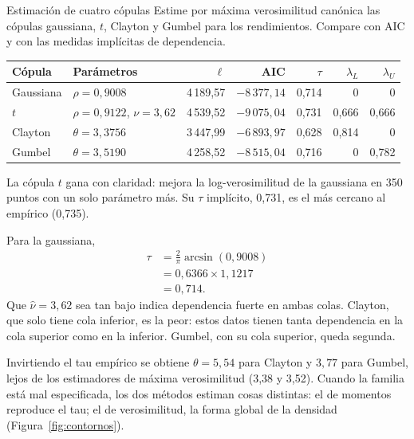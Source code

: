 \begin{ejresuelto}{Estimación de cuatro cópulas}\label{ej:cuatro}
\enunciado Estime por máxima verosimilitud canónica las cópulas gaussiana, $t$, Clayton y Gumbel para los rendimientos.
Compare con AIC y con las medidas implícitas de dependencia.

\solucion
{}
\begin{center}\small
\begin{tabular}{@{}llrrrrr@{}}
\toprule
Cópula & Parámetros & $\ell$ & AIC & $\tau$ & $\lambda_L$ & $\lambda_U$ \\
\midrule
Gaussiana & $\rho=0{,}9008$ & 4\,189,57 & $-8\,377{,}14$ & 0,714 & 0 & 0 \\
$t$ & $\rho=0{,}9122$, $\nu=3{,}62$ & 4\,539,52 & $-9\,075{,}04$ & 0,731 & 0,666 & 0,666 \\
Clayton & $\theta=3{,}3756$ & 3\,447,99 & $-6\,893{,}97$ & 0,628 & 0,814 & 0 \\
Gumbel & $\theta=3{,}5190$ & 4\,258,52 & $-8\,515{,}04$ & 0,716 & 0 & 0,782 \\
\bottomrule
\end{tabular}
\end{center}
La cópula $t$ gana con claridad: mejora la log-verosimilitud de la gaussiana en 350 puntos con un solo parámetro más. Su
$\tau$ implícito, 0,731, es el más cercano al empírico (0,735).

 Para la gaussiana,
\begin{align*}
  \tau &= \frac2\pi\arcsin(0{,}9008)\\
       &= 0{,}6366\times1{,}1217\\
       &= 0{,}714 .
\end{align*}
Que $\hat\nu=3{,}62$ sea tan bajo indica dependencia fuerte en ambas colas. Clayton, que solo tiene cola inferior, es la peor:
estos datos tienen tanta dependencia en la cola superior como en la inferior. Gumbel, con su cola superior, queda segunda.

 Invirtiendo el tau empírico se obtiene $\theta=5{,}54$ para Clayton y $3{,}77$
para Gumbel, lejos de los estimadores de máxima verosimilitud (3,38 y 3,52). Cuando la familia está mal especificada, los dos
métodos estiman cosas distintas: el de momentos reproduce el tau; el de verosimilitud, la forma global de la densidad
(Figura~\ref{fig:contornos}).



\end{ejresuelto}
